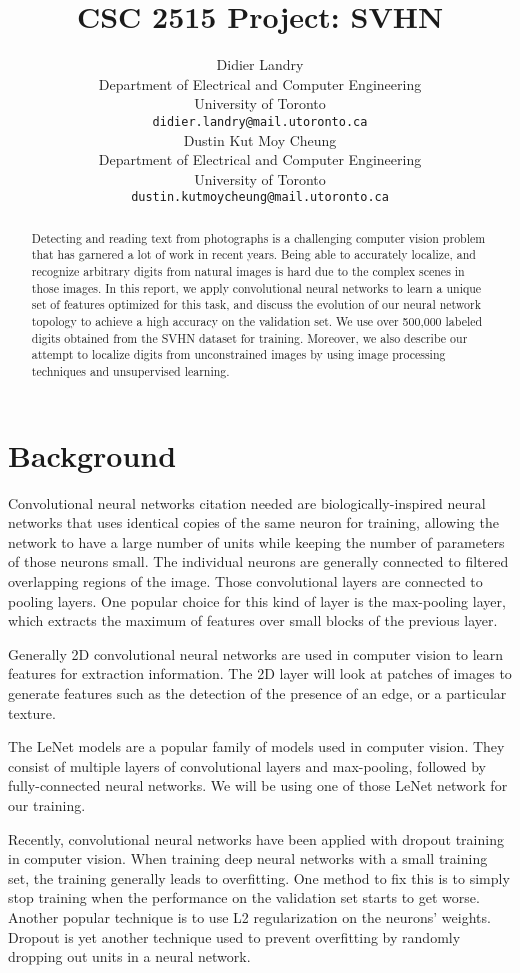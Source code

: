 \documentclass{article} %
\title{CSC 2515 Project: SVHN}
\author{
Didier Landry\\
Department of Electrical and Computer Engineering\\
University of Toronto\\
\texttt{didier.landry@mail.utoronto.ca} \\
\And
Dustin Kut Moy Cheung\\
Department of Electrical and Computer Engineering\\
University of Toronto\\
\texttt{dustin.kutmoycheung@mail.utoronto.ca} \\
}
\begin{document}
\maketitle

\begin{abstract}
Detecting and reading text from photographs is a challenging computer vision problem that has garnered a lot of work in recent years. Being able to accurately localize, and recognize arbitrary digits from natural images is hard due to the complex scenes in those images. In this report, we apply convolutional neural networks to learn a unique set of features optimized for this task, and discuss the evolution of our neural network topology to achieve a high accuracy on the validation set. We use over 500,000 labeled digits obtained from the SVHN\cite{svhn} dataset for training. Moreover, we also describe our attempt to localize digits from unconstrained images by using image processing techniques and unsupervised learning.
\end{abstract}

\section{Background}
Convolutional neural networks {citation needed} are biologically-inspired neural networks that uses identical copies of the same neuron for training, allowing the network to have a large number of units while keeping the number of parameters of those neurons small. The individual neurons are generally connected to filtered overlapping regions of the image. Those convolutional layers are connected to pooling layers. One popular choice for this kind of layer is the max-pooling layer, which extracts the maximum of features over small blocks of the previous layer.

Generally 2D convolutional neural networks are used in computer vision to learn features for extraction information. The 2D layer will look at patches of images to generate features such as the detection of the presence of an edge, or a particular texture.

The LeNet models are a popular family of models used in computer vision. They consist of multiple layers of convolutional layers and max-pooling, followed by fully-connected neural networks. We will be using one of those LeNet network for our training.

Recently, convolutional neural networks have been applied with dropout training in computer vision. When training deep neural networks with a small training set, the training generally leads to overfitting. One method to fix this is to simply stop training when the performance on the validation set starts to get worse. Another popular technique is to use L2 regularization on the neurons’ weights. Dropout is yet another technique used to prevent overfitting by randomly dropping out units in a neural network.
\end{document}
